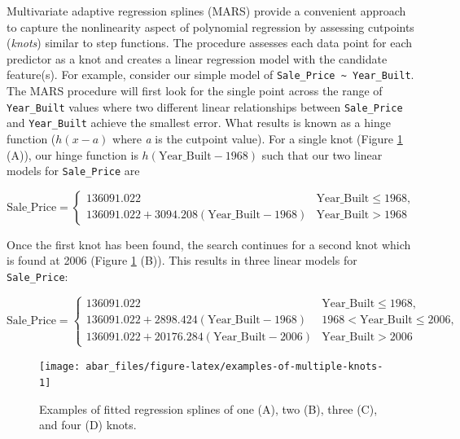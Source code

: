 \documentclass[]{book}
\theoremstyle{definition}
\theoremstyle{definition}
\theoremstyle{definition}
\theoremstyle{remark}
\begin{document}
Multivariate adaptive regression splines (MARS) provide a convenient
approach to capture the nonlinearity aspect of polynomial regression by
assessing cutpoints (\emph{knots}) similar to step functions. The
procedure assesses each data point for each predictor as a knot and
creates a linear regression model with the candidate feature(s). For
example, consider our simple model of
\texttt{Sale\_Price\ \textasciitilde{}\ Year\_Built}. The MARS procedure
will first look for the single point across the range of
\texttt{Year\_Built} values where two different linear relationships
between \texttt{Sale\_Price} and \texttt{Year\_Built} achieve the
smallest error. What results is known as a hinge function (\(h(x-a)\)
where \emph{a} is the cutpoint value). For a single knot (Figure
\ref{fig:examples-of-multiple-knots} (A)), our hinge function is
\(h(\text{Year_Built}-1968)\) such that our two linear models for
\texttt{Sale\_Price} are

\begin{equation}
\label{eq:hinge}
  \text{Sale_Price} = 
  \begin{cases}
    136091.022 & \text{Year_Built} \leq 1968, \\
    136091.022 + 3094.208(\text{Year_Built} - 1968) & \text{Year_Built} > 1968
  \end{cases}
\end{equation}

Once the first knot has been found, the search continues for a second
knot which is found at 2006 (Figure \ref{fig:examples-of-multiple-knots}
(B)). This results in three linear models for \texttt{Sale\_Price}:

\begin{equation}
\label{eq:hinge2}
  \text{Sale_Price} = 
  \begin{cases}
    136091.022 & \text{Year_Built} \leq 1968, \\
    136091.022 + 2898.424(\text{Year_Built} - 1968) & 1968 < \text{Year_Built} \leq 2006, \\
    136091.022 + 20176.284(\text{Year_Built} - 2006) & \text{Year_Built} > 2006
  \end{cases}
\end{equation}

\begin{figure}

{\centering \texttt{[image: abar\_files/figure-latex/examples-of-multiple-knots-1]} 

}

\caption{Examples of fitted regression splines of one (A), two (B), three (C), and four (D) knots.}\label{fig:examples-of-multiple-knots}
\end{figure}
\end{document}
